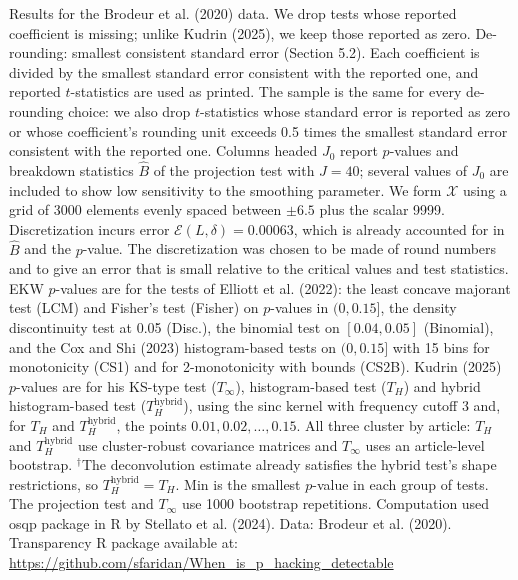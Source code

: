 \begin{table}[htbp]
\medskip
\begin{minipage}{\linewidth}
Results for the Brodeur et al. (2020) data. We drop tests whose reported coefficient is missing; unlike Kudrin (2025), we keep those reported as zero.
De-rounding: smallest consistent standard error (Section 5.2). Each coefficient is divided by the smallest standard error consistent with the reported one, and reported $t$-statistics are used as printed.
The sample is the same for every de-rounding choice: we also drop $t$-statistics whose standard error is reported as zero or whose coefficient's rounding unit exceeds 0.5 times the smallest standard error consistent with the reported one.
Columns headed $J_0$ report $p$-values and breakdown statistics $\widehat{B}$ of the projection test with $J=40$; several values of $J_0$ are included to show low sensitivity to the smoothing parameter.
We form $\mathcal{X}$ using a grid of 3000 elements evenly spaced between $\pm 6.5$ plus the scalar 9999.
Discretization incurs error $\mathcal{E}(L,\delta)=0.00063$, which is already accounted for in $\widehat{B}$ and the $p$-value.
The discretization was chosen to be made of round numbers and to give an error that is small relative to the critical values and test statistics.
EKW $p$-values are for the tests of Elliott et al. (2022): the least concave majorant test (LCM) and Fisher's test (Fisher) on $p$-values in $(0,0.15]$, the density discontinuity test at 0.05 (Disc.), the binomial test on $[0.04,0.05]$ (Binomial), and the Cox and Shi (2023) histogram-based tests on $(0,0.15]$ with 15 bins for monotonicity (CS1) and for 2-monotonicity with bounds (CS2B).
Kudrin (2025) $p$-values are for his KS-type test ($T_\infty$), histogram-based test ($T_H$) and hybrid histogram-based test ($T_H^{\mathrm{hybrid}}$), using the sinc kernel with frequency cutoff 3 and, for $T_H$ and $T_H^{\mathrm{hybrid}}$, the points $0.01,0.02,\ldots,0.15$.
All three cluster by article: $T_H$ and $T_H^{\mathrm{hybrid}}$ use cluster-robust covariance matrices and $T_\infty$ uses an article-level bootstrap.
$^\dagger$The deconvolution estimate already satisfies the hybrid test's shape restrictions, so $T_H^{\mathrm{hybrid}}=T_H$.
Min is the smallest $p$-value in each group of tests.
The projection test and $T_\infty$ use 1000 bootstrap repetitions.
Computation used osqp package in R by Stellato et al. (2024). Data: Brodeur et al. (2020).
Transparency R package available at: \url{https://github.com/sfaridan/When_is_p_hacking_detectable}
\end{minipage}
\end{table}
